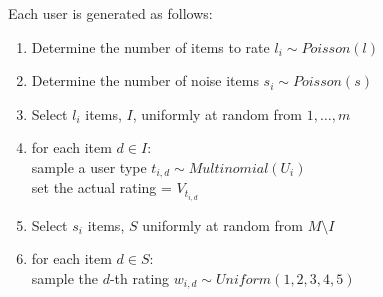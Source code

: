 \documentclass[11pt]{article}
\theoremstyle{definition}
\begin{document}
Each user is generated as follows:
\begin{enumerate}
	\item Determine the number of items to rate $l_i\sim Poisson(l)$
	\item Determine the number of noise items $s_i\sim Poisson(s)$
	\item Select $l_i$ items, $I$, uniformly at random from $1, \ldots, m$
	\item for each item $d \in I$:\\
				\hspace*{5 mm} sample a user type $t_{i,d}\sim Multinomial(U_i)$\\
				\hspace*{5 mm} set the actual rating = $V_{t_{i,d}}$
	\item Select $s_i$ items, $S$ uniformly at random from $M \setminus I$
	\item for each item $d \in S$:\\
				\hspace*{5 mm} sample the $d$-th rating $w_{i,d}\sim Uniform({1,2,3,4,5})$ 
\end{enumerate}
\end{document}
